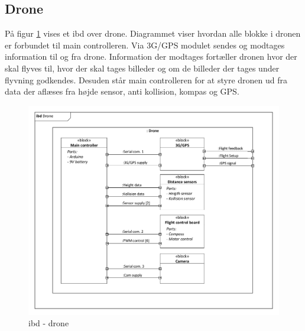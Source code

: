 \subsection{Drone}

På figur \ref{fig:ibd_drone} vises et ibd over drone. Diagrammet viser hvordan alle blokke i dronen er forbundet til main controlleren. Via 3G/GPS modulet sendes og modtages information til og fra drone. Information der modtages fortæller dronen hvor der skal flyves til, hvor der skal tages billeder og om de billeder der tages under flyvning godkendes. Desuden står main controlleren for at styre dronen ud fra data der aflæses fra højde sensor, anti kollision, kompas og GPS. 

\begin{figure}[H]
\centering
\includegraphics[width=1\textwidth]{Billeder/IBD/ibd2_drone.pdf}
\vspace{-1cm}
\caption{ibd - drone}
\label{fig:ibd_drone}
\end{figure}

